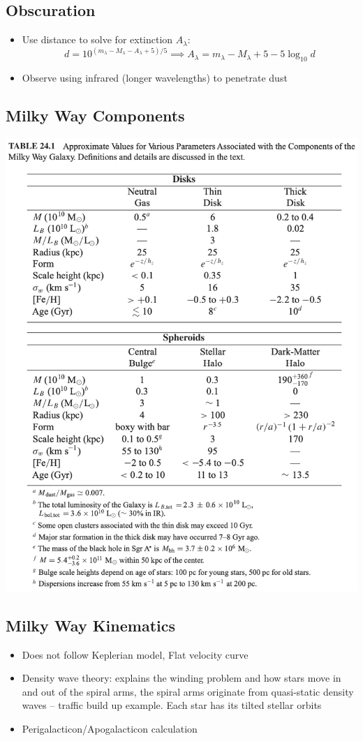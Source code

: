 \documentclass{book}
\begin{document}
\subsection{Obscuration}
\begin{itemize}
    \item Use distance to solve for extinction $A_\lambda$:
          \begin{equation*}
              d = 10^{(m_\lambda - M_\lambda - A_\lambda + 5)/5} \implies A_\lambda = m_\lambda - M_\lambda + 5 - 5 \log_{10} d \tag{C\&O 24.1}
          \end{equation*}
    \item Observe using infrared (longer wavelengths) to penetrate dust
\end{itemize}
\subsection{Milky Way Components}
\begin{center}
    \includegraphics[height=\textwidth]{images/co_table24_1.png}
\end{center}
\subsection{Milky Way Kinematics}
\begin{itemize}
    \item Does not follow Keplerian model, Flat velocity curve
    \item Density wave theory: explains the winding problem and how stars move in and out of the spiral arms, the spiral arms originate from quasi-static density waves -- traffic build up example. Each star has its tilted stellar orbits
    \item Perigalacticon/Apogalacticon calculation

\end{itemize}
\end{document}
